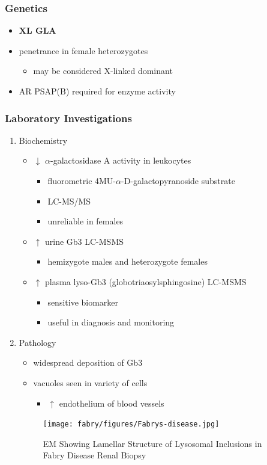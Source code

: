 \documentclass[12pt]{scrartcl}
\begin{document}
\subsubsection{Genetics}
\label{sec:org955c637}
\begin{itemize}
\item \textbf{XL GLA}
\item penetrance in female heterozygotes
\begin{itemize}
\item may be considered X-linked dominant
\end{itemize}
\item AR PSAP(B) required for enzyme activity
\end{itemize}
\subsubsection{Laboratory Investigations}
\label{sec:org6c4f5dd}
\begin{enumerate}
\item Biochemistry
\label{sec:org1b3a7cb}
\begin{itemize}
\item \(\downarrow\) \(\alpha\)-galactosidase A activity in leukocytes
\begin{itemize}
\item fluorometric 4MU-\(\alpha\)-D-galactopyranoside substrate
\item LC-MS/MS
\item unreliable in females
\end{itemize}
\item \(\uparrow\) urine Gb3 LC-MSMS 
\begin{itemize}
\item hemizygote males and heterozygote females
\end{itemize}
\item \(\uparrow\) plasma lyso-Gb3 (globotriaosylsphingosine) LC-MSMS
\begin{itemize}
\item sensitive biomarker
\item useful in diagnosis and monitoring
\end{itemize}
\end{itemize}

\item Pathology
\label{sec:org90f3ab5}
\begin{itemize}
\item widespread deposition of Gb3
\item vacuoles seen in variety of cells
\begin{itemize}
\item \(\uparrow\) endothelium of blood vessels
\end{itemize}
\end{itemize}

\begin{figure}[htbp]
\centering
\texttt{[image: fabry/figures/Fabrys-disease.jpg]}
\caption[Fabry EM]{\label{fig:orge258f18}EM Showing Lamellar Structure of Lysosomal Inclusions in Fabry Disease Renal Biopsy}
\end{figure}
\end{enumerate}
\end{document}
